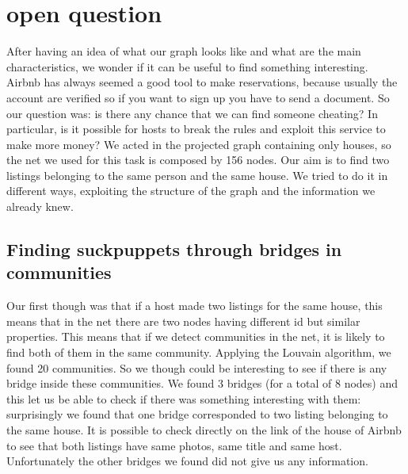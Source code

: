 \documentclass[sigchi]{acmart}
\begin{document}
\section{open question} \label{sec7}

After having an idea of what our graph looks like and what are the main characteristics, we wonder if it can be useful to find something interesting. Airbnb has always seemed a good tool to make reservations, because usually the account are verified so if you want to sign up you have to send a document. So our question was: is there any chance that we can find someone cheating? In particular, is it possible for hosts to break the rules and exploit this service to make more money? We acted in the projected graph containing only houses, so the net we used for this task is composed by 156 nodes. Our aim is to find two listings belonging to the same person and the same house. We tried to do it in different ways, exploiting the structure of the graph and the information we already knew. 

\subsection{Finding suckpuppets through bridges in communities}
Our first though was that if a host made two listings for the same house, this means that in the net there are two nodes having different id but similar properties. This means that if we detect communities in the net, it is likely to find both of them in the same community. Applying the Louvain algorithm, we found 20 communities. So we though could be interesting to see if there is any bridge inside these communities. We found 3 bridges (for a total of 8 nodes) and this let us be able to check if there was something interesting with them: surprisingly we found that one bridge corresponded to two listing belonging to the same house. It is possible to check directly on the link of the house of Airbnb to see that both listings have same photos, same title and same host. \newline
Unfortunately the other bridges we found did not give us any information. 
\end{document}
